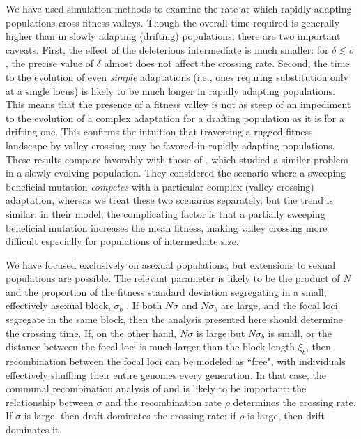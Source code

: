 \documentclass[rmp]{revtex4}
\begin{document}
\begin{spacing}{1.5}
We have used simulation methods to examine the rate at which rapidly adapting populations cross fitness valleys.
Though the overall time required is generally higher than in slowly adapting (drifting) populations, there are two important caveats.
First, the effect of the deleterious intermediate is much smaller: for $\delta \lesssim \sigma$, the precise value of $\delta$ almost does not affect the crossing rate.
Second, the time to the evolution of even \emph{simple} adaptations (i.e., ones requring substitution only at a single locus) is likely to be much longer in rapidly adapting populations.
This means that the presence of a fitness valley is not as steep of an impediment to the evolution of a complex adaptation for a drafting population as it is for a drifting one.
This confirms the intuition that traversing a rugged fitness landscape by valley crossing may be favored in rapidly adapting populations.
These results compare favorably with those of \citet{ochs_2015}, which studied a similar problem in a slowly evolving population.
They considered the scenario where a sweeping beneficial mutation \emph{competes} with a particular complex (valley crossing) adaptation, whereas we treat these two scenarios separately, but the trend is similar: in their model, the complicating factor is that a partially sweeping beneficial mutation increases the mean fitness, making valley crossing more difficult especially for populations of intermediate size.

We have focused exclusively on asexual populations, but extensions to sexual populations are possible.
The relevant parameter is likely to be the product of $N$ and the proportion of the fitness standard deviation segregating in a small, effectively asexual block, $\sigma_b$ \citep{neher_kessinger_2013}.
If both $N\sigma$ and $N\sigma_b$ are large, and the focal loci segregate in the same block, then the analysis presented here should determine the crossing time.
If, on the other hand, $N\sigma$ is large but $N\sigma_b$ is small, or the distance between the focal loci is much larger than the block length $\xi_b$, then recombination between the focal loci can be modeled as ``free", with individuals effectively shuffling their entire genomes every generation.
In that case, the communal recombination analysis of \citet{neher_shraiman_2011} and \citet{neher_shraiman_2010} is likely to be important: the relationship between $\sigma$ and the recombination rate $\rho$ determines the crossing rate.
If $\sigma$ is large, then draft dominates the crossing rate: if $\rho$ is large, then drift dominates it.


\end{spacing}
\end{document}
